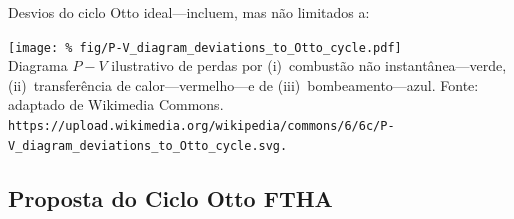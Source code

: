     \begin{frame}{Desvios do ciclo Otto ideal---incluem, mas não limitados a:}\vspace*{-2em}
        \begin{center}
            \texttt{[image: \%
                fig/P-V\_diagram\_deviations\_to\_Otto\_cycle.pdf]}\\
            \footnotesize  Diagrama  $P-V$  ilustrativo  de   perdas   por   (i)~combustão   não
                instantânea---verde,    (ii)~transferência    de     calor---vermelho---e     de
                (iii)~bombeamento---azul. Fonte: adaptado de Wikimedia Commons.
            {\tiny\tt https://upload.wikimedia.org/wikipedia/commons/6/6c/P-V\_diagram\_deviations\_to\_Otto\_cycle.svg.}
        \end{center}
    \end{frame}

\subsection{Proposta do Ciclo Otto FTHA}

